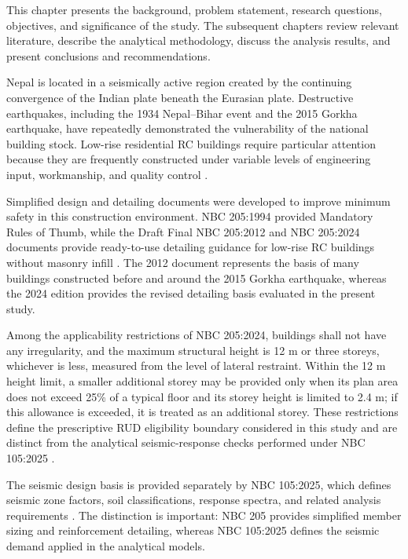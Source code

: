 This chapter presents the background, problem statement, research questions, objectives, and significance of the study. The subsequent chapters review relevant literature, describe the analytical methodology, discuss the analysis results, and present conclusions and recommendations.

Nepal is located in a seismically active region created by the continuing convergence of the Indian plate beneath the Eurasian plate. Destructive earthquakes, including the 1934 Nepal--Bihar event and the 2015 Gorkha earthquake, have repeatedly demonstrated the vulnerability of the national building stock. Low-rise residential RC buildings require particular attention because they are frequently constructed under variable levels of engineering input, workmanship, and quality control \cite{thapa2013psha,parajuli2015gorkha}.

Simplified design and detailing documents were developed to improve minimum safety in this construction environment. NBC 205:1994 provided Mandatory Rules of Thumb, while the Draft Final NBC 205:2012 and NBC 205:2024 documents provide ready-to-use detailing guidance for low-rise RC buildings without masonry infill \cite{nbc205_1994,nbc205_2012,nbc205_2024}. The 2012 document represents the basis of many buildings constructed before and around the 2015 Gorkha earthquake, whereas the 2024 edition provides the revised detailing basis evaluated in the present study.

Among the applicability restrictions of NBC 205:2024, buildings shall not have any irregularity, and the maximum structural height is 12 m or three storeys, whichever is less, measured from the level of lateral restraint. Within the 12 m height limit, a smaller additional storey may be provided only when its plan area does not exceed 25\% of a typical floor and its storey height is limited to 2.4 m; if this allowance is exceeded, it is treated as an additional storey. These restrictions define the prescriptive RUD eligibility boundary considered in this study and are distinct from the analytical seismic-response checks performed under NBC 105:2025 \cite{nbc205_2024}.

The seismic design basis is provided separately by NBC 105:2025, which defines seismic zone factors, soil classifications, response spectra, and related analysis requirements \cite{nbc105_2025}. The distinction is important: NBC 205 provides simplified member sizing and reinforcement detailing, whereas NBC 105:2025 defines the seismic demand applied in the analytical models.

